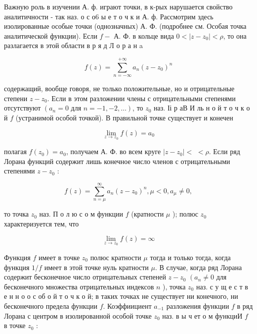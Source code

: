 \documentclass[10pt]{article}
\begin{document}
Важную роль в изучении А. ф. играют точки, в к-рых нарушается свойство аналитичности - так наз. о с о6 ы е т о ч к и А. ф. Рассмотрим здесь изолированные особые точки (однозначных) А. Ф. (подробнее см. Особая точка аналитической функции). Если $f-$ А. Ф. в кольце вида $0<\left|z-z_{0}\right|<\rho$, то она разлагается в этой области в р я д Л о р а н a



\[

f(z)=\sum_{n=-\infty}^{+\infty} a_{n}\left(z-z_{0}\right)^{n}

\]



содержащий, вообще говоря, не только положительные, но и отрицательные степени $z-z_{0}$. Если в этом разложении члены с отрицательными степенями отсутствуют $\left(a_{n}=0\right.$ для $\left.n=-1,-2, \ldots\right)$, то $z_{0}$ наз. Іі р аВ И ль н о й т о ч к о й $f$ (устранимой особой точкой). В правильной точке существует и конечен



\[

\lim _{z \rightarrow z_{0}} f(z)=a_{0}

\]



полагая $f\left(z_{0}\right)=a_{0}$, получаем А. Ф. во всем круге $\left|z-z_{0}\right|<$ $<\rho$. Если ряд Лорана функций содержит лишь конечное число членов с отрицательными степенями $z-z_{0}$ :



\[

f(z)=\sum_{n=\mu}^{\infty} a_{n}\left(z-z_{0}\right)^{n}, \mu<0, a_{\mu} \neq 0,

\]



то точка $z_{0}$ наз. П о л ю с о м функции $f$ (кратности $\mu$ ); полюс $z_{0}$ характеризуется тем, что



\[

\lim _{z \rightarrow z_{0}} f(z)=\infty

\]



Функция $f$ имеет в точке $z_{0}$ полюс кратности $\mu$ тогда и только тогда, когда функция $1 / f$ имеет в этой точке нуль кратности $\mu$. В случае, когда ряд Лорана содержит бесконечное число отрицательных степеней $z-z_{0}$ $\left(a_{n} \neq 0\right.$ для бесконечного множества отрицательных индексов $n$ ), точка $z_{0}$ наз. с у щ е с т в е н н о о с об о й т о ч к о й; в таких точках не существует ни конечного, ни бесконечного предела функции $f$. Коэффиициент $a_{-1}$ разложения функции $f$ в ряд Лорана с центром в изолированной особой точке $z_{0}$ наз. в ы ч ет о м функциИ $f$ в точке $z_{0}$ :
\end{document}

